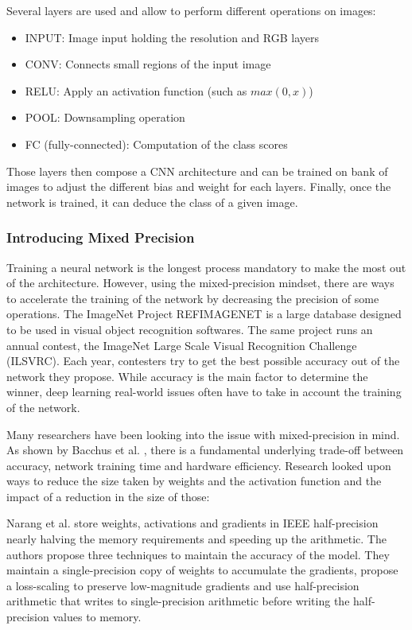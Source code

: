 Several layers are used and allow to perform different operations on images:
\begin{itemize}
  \item INPUT: Image input holding the resolution and RGB layers
  \item CONV: Connects small regions of the input image
  \item RELU: Apply an activation function (such as $max(0,x)$)
  \item POOL: Downsampling operation
  \item FC (fully-connected): Computation of the class scores
\end{itemize}

Those layers then compose a CNN architecture and can be trained on bank of images to adjust the different bias and weight for each layers. Finally, once the network is trained, it can deduce the class of a given image.


\subsubsection{Introducing Mixed Precision}

Training a neural network is the longest process mandatory to make the most out of the architecture. However, using the mixed-precision mindset, there are ways to accelerate the training of the network by decreasing the precision of some operations. The ImageNet Project REFIMAGENET is a large database designed to be used in visual object recognition softwares. The same project runs an annual contest, the ImageNet Large Scale Visual Recognition Challenge (ILSVRC). Each year, contesters try to get the best possible accuracy out of the network they propose. While accuracy is the main factor to determine the winner, deep learning real-world issues often have to take in account the training of the network.

Many researchers have been looking into the issue with mixed-precision in mind. As shown by Bacchus et al. \cite{Bacchus2020}, there is a fundamental underlying trade-off between accuracy, network training time and hardware efficiency. Research looked upon ways to reduce the size taken by weights and the activation function and the impact of a reduction in the size of those:

Narang et al. \cite{Narang2018} store weights, activations and gradients in IEEE half-precision nearly halving the memory requirements and speeding up the arithmetic. The authors propose three techniques to maintain the accuracy of the model. They maintain a single-precision copy of weights to accumulate the gradients, propose a loss-scaling to preserve low-magnitude gradients and use half-precision arithmetic that writes to single-precision arithmetic before writing the half-precision values to memory.

